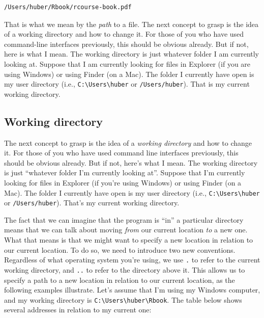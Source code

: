 \documentclass[
  12pt,
  oneside]{book}
\theoremstyle{definition}
\theoremstyle{definition}
\theoremstyle{definition}
\theoremstyle{definition}
\theoremstyle{remark}
\begin{document}
\begin{verbatim}
/Users/huber/Rbook/rcourse-book.pdf
\end{verbatim}

That is what we mean by the \emph{path} to a file. The next concept to grasp is the idea of a working directory and how to change it. For those of you who have used command-line interfaces previously, this should be obvious already. But if not, here is what I mean. The working directory is just whatever folder I am currently looking at. Suppose that I am currently looking for files in Explorer (if you are using Windows) or using Finder (on a Mac). The folder I currently have open is my user directory (i.e., \texttt{C:\textbackslash{}Users\textbackslash{}huber} or \texttt{/Users/huber}). That is my current working directory.

\hypertarget{working-directory}{%
\subsection{Working directory}\label{working-directory}}

The next concept to grasp is the idea of a \emph{working directory} and how to change it. For those of you who have used command line interfaces previously, this should be obvious already. But if not, here's what I mean. The working directory is just ``whatever folder I'm currently looking at''. Suppose that I'm currently looking for files in Explorer (if you're using Windows) or using Finder (on a Mac). The folder I currently have open is my user directory (i.e., \texttt{C:\textbackslash{}Users\textbackslash{}huber} or \texttt{/Users/huber}). That's my current working directory.

The fact that we can imagine that the program is ``in'' a particular directory means that we can talk about moving \emph{from} our current location \emph{to} a new one. What that means is that we might want to specify a new location in relation to our current location. To do so, we need to introduce two new conventions. Regardless of what operating system you're using, we use \texttt{.} to refer to the current working directory, and \texttt{..} to refer to the directory above it. This allows us to specify a path to a new location in relation to our current location, as the following examples illustrate. Let's assume that I'm using my Windows computer, and my working directory is \texttt{C:\textbackslash{}Users\textbackslash{}huber\textbackslash{}Rbook}. The table below shows several addresses in relation to my current one:
\end{document}
